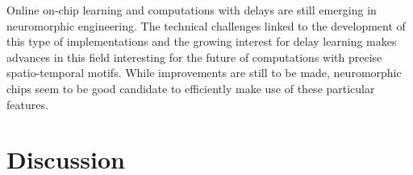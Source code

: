 \documentclass[brainsci, %
               review,submit,pdftex,moreauthors
               ]{Definitions/mdpi}
\begin{document}
Online on-chip learning and computations with delays are still emerging in neuromorphic engineering. The technical challenges linked to the development of this type of implementations and the growing interest for delay learning makes advances in this field interesting for the future of computations with precise spatio-temporal motifs. While improvements are still to be made, neuromorphic chips seem to be good candidate to efficiently make use of these particular features. 
%
%
%
%
%
%
\section{Discussion}\label{sec:discussion}
\end{document}
